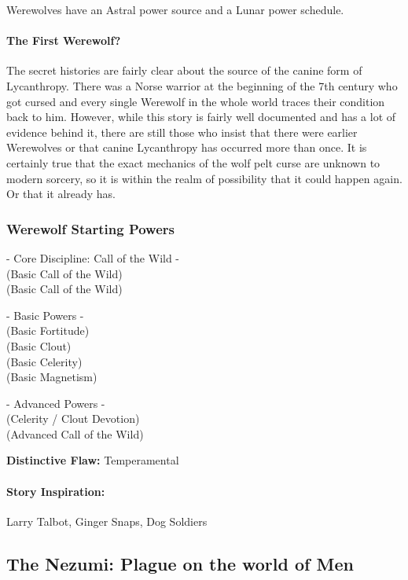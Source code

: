 Werewolves have an Astral power source and a Lunar power schedule.

\paragraph{The First Werewolf?}
The secret histories are fairly clear about the source of the canine form of Lycanthropy. There was a Norse warrior at the beginning of the 7th century who got cursed and every single Werewolf in the whole world traces their condition back to him. However, while this story is fairly well documented and has a lot of evidence behind it, there are still those who insist that there were earlier Werewolves or that canine Lycanthropy has occurred more than once. It is certainly true that the exact mechanics of the wolf pelt curse are unknown to modern sorcery, so it is within the realm of possibility that it could happen again. Or that it already has.

\subsubsection{Werewolf Starting Powers}

\hspace{\parindent} - Core Discipline: Call of the Wild -\\
 (Basic Call of the Wild)\\
 (Basic Call of the Wild)

- Basic Powers -\\
 (Basic Fortitude)\\
 (Basic Clout)\\
 (Basic Celerity)\\
 (Basic Magnetism)

- Advanced Powers -\\
 (Celerity / Clout Devotion)\\
 (Advanced Call of the Wild)

\textbf{Distinctive Flaw:} Temperamental

\paragraph{Story Inspiration:} Larry Talbot, Ginger Snaps, Dog Soldiers

\subsection[Nezumi]{The Nezumi: Plague on the world of Men} 

